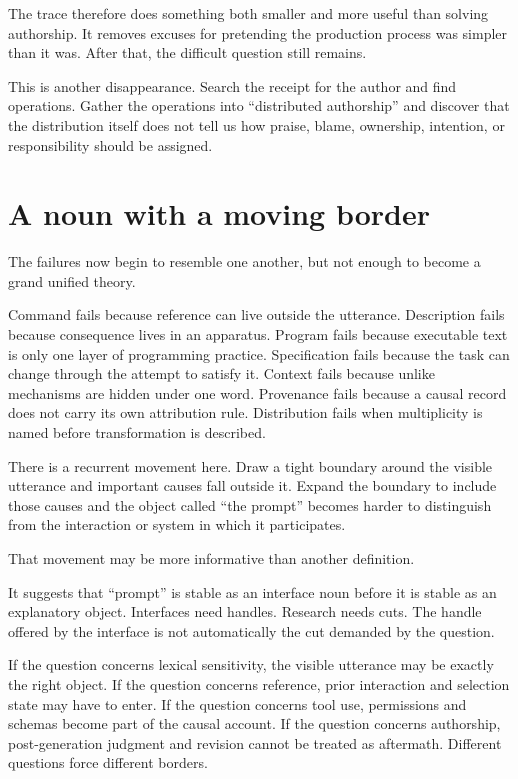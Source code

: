 \documentclass[11pt]{article}
\begin{document}
The trace therefore does something both smaller and more useful than solving authorship. It removes excuses for pretending the production process was simpler than it was. After that, the difficult question still remains.

This is another disappearance. Search the receipt for the author and find operations. Gather the operations into ``distributed authorship'' and discover that the distribution itself does not tell us how praise, blame, ownership, intention, or responsibility should be assigned.

\section{A noun with a moving border}

The failures now begin to resemble one another, but not enough to become a grand unified theory.

Command fails because reference can live outside the utterance. Description fails because consequence lives in an apparatus. Program fails because executable text is only one layer of programming practice. Specification fails because the task can change through the attempt to satisfy it. Context fails because unlike mechanisms are hidden under one word. Provenance fails because a causal record does not carry its own attribution rule. Distribution fails when multiplicity is named before transformation is described.

There is a recurrent movement here. Draw a tight boundary around the visible utterance and important causes fall outside it. Expand the boundary to include those causes and the object called ``the prompt'' becomes harder to distinguish from the interaction or system in which it participates.

That movement may be more informative than another definition.

It suggests that ``prompt'' is stable as an interface noun before it is stable as an explanatory object. Interfaces need handles. Research needs cuts. The handle offered by the interface is not automatically the cut demanded by the question.

If the question concerns lexical sensitivity, the visible utterance may be exactly the right object. If the question concerns reference, prior interaction and selection state may have to enter. If the question concerns tool use, permissions and schemas become part of the causal account. If the question concerns authorship, post-generation judgment and revision cannot be treated as aftermath. Different questions force different borders.
\end{document}
